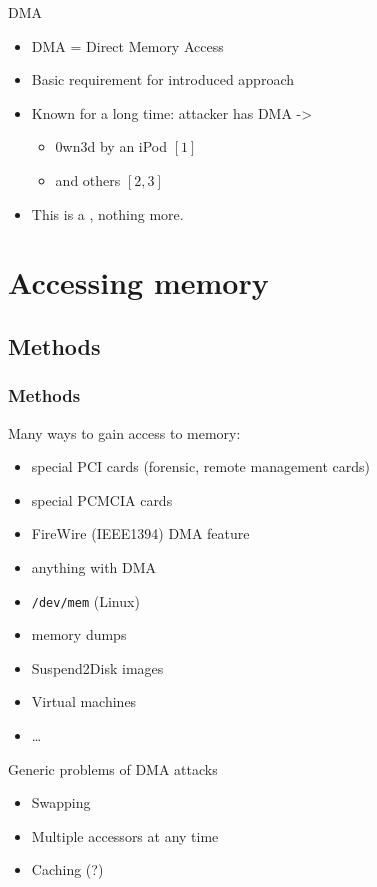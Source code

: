 \documentclass{beamer}
\newenvironment{itemizeframe}[1]
  {\begin{frame}{#1}\startitemizeframe}
  {\stopitemizeframe\end{frame}}
\newcommand\startitemizeframe{\begin{itemize}}
\newcommand\stopitemizeframe{\end{itemize}}
\begin{document}
		\begin{itemizeframe}{DMA}
			\item DMA = Direct Memory Access
			\item Basic requirement for introduced approach
			\item Known for a long time: attacker has DMA -> 
				\begin{itemize}
					\item 0wn3d by an iPod $[1]$
					\item and others $[2,3]$
				\end{itemize}
			\item This is a , nothing more.
		\end{itemizeframe}

\section{Accessing memory}

	\subsection{Methods}

		\begin{frame} \frametitle{Methods}
			Many ways to gain access to memory:
			\begin{itemize}
				\item special PCI cards (forensic, remote management cards)
				\item special PCMCIA cards
				\item FireWire (IEEE1394) DMA feature
				\item anything with DMA
				\item \texttt{/dev/mem} (Linux)
				\item memory dumps
				\item Suspend2Disk images
				\item Virtual machines
				\item \ldots
			\end{itemize}
		\end{frame}

		\begin{itemizeframe}{Generic problems of DMA attacks}
			\item Swapping
			\item Multiple accessors at any time
			\item Caching (?)
		\end{itemizeframe}
\end{document}
